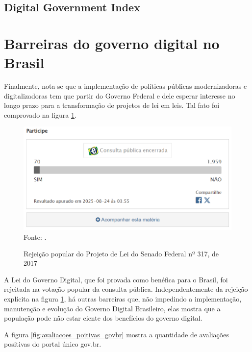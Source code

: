 \subsection{Digital Government Index}

\section{Barreiras do governo digital no Brasil}

Finalmente, nota-se que a implementação de políticas públicas modernizadoras e digitalizadoras tem que partir do Governo Federal e dele esperar interesse no longo prazo para a transformação de projetos de lei em leis. Tal fato foi comprovado na figura \ref{fig:participacao_votacao_popular_lgd}.

\begin{figure}[H]
	\centering
	\caption{Rejeição popular do Projeto de Lei do Senado Federal nº 317, de 2017}
	\includegraphics[width=1\linewidth]{figuras/participacao_votacao_popular_lgd}
	\label{fig:participacao_votacao_popular_lgd}
	\footnotesize{Fonte: \cite{pls_317_2021}.}
\end{figure}

A Lei do Governo Digital, que foi provada como benéfica para o Brasil, foi rejeitada na votação popular da consulta pública. Independentemente da rejeição explícita na figura \ref{fig:participacao_votacao_popular_lgd}, há outras barreiras que, não impedindo a implementação, manutenção e evolução do Governo Digital Brasileiro, elas mostra que a população pode não estar ciente dos benefícios do governo digital.
	
A figura \ref{fig:avaliacoes_poitivas_govbr} mostra a quantidade de avaliações positivas do portal único gov.br.
	
